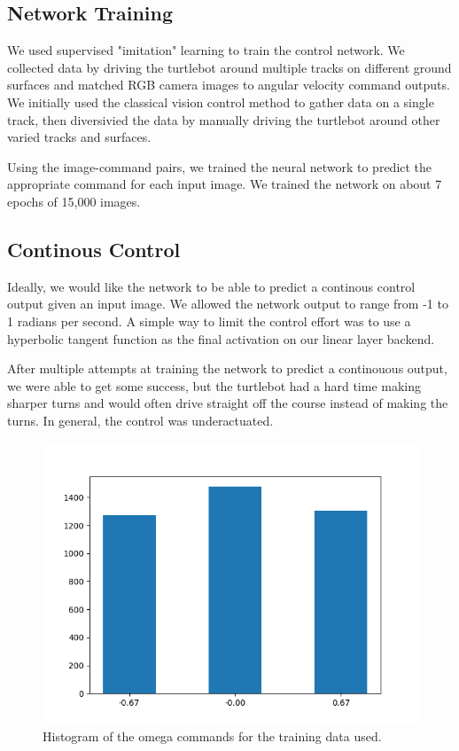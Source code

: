 \subsection{Network Training}
We used supervised "imitation" learning to train the control network. We collected data by driving the turtlebot around multiple tracks on different ground surfaces and matched RGB camera images to angular velocity command outputs. We initially used the classical vision control method to gather data on a single track, then diversivied the data by manually driving the turtlebot around other varied tracks and surfaces.

Using the image-command pairs, we trained the neural network to predict the appropriate command for each input image. We trained the network on about 7 epochs of 15,000 images.

\subsection{Continous Control}
Ideally, we would like the network to be able to predict a continous control output given an input image. We allowed the network output to range from -1 to 1 radians per second. A simple way to limit the control effort was to use a hyperbolic tangent function as the final activation on our linear layer backend.

After multiple attempts at training the network to predict a continouous output, we were able to get some success, but the turtlebot had a hard time making sharper turns and would often drive straight off the course instead of making the turns. In general, the control was underactuated.

\begin{figure}[hbt]
  \includegraphics[width=\columnwidth]{figures/data_histogram}
  \caption{Histogram of the omega commands for the training data used.}
  \label{fig:data_hist}
\end{figure}

